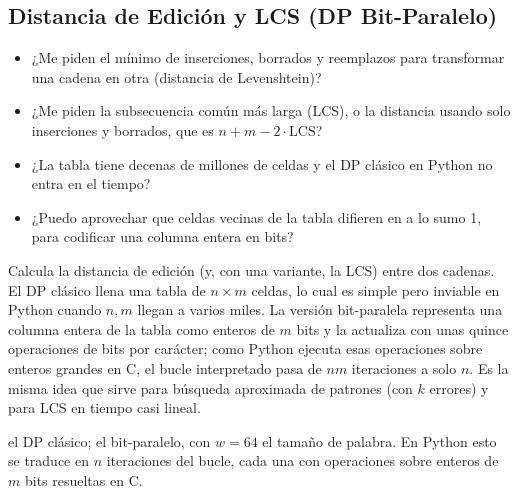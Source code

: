 \subsection{Distancia de Edición y LCS (DP Bit-Paralelo)}
\label{alg:6-2}


\begin{itemize}
\item ¿Me piden el mínimo de inserciones, borrados y reemplazos para transformar una cadena en otra (distancia de Levenshtein)?
\item ¿Me piden la subsecuencia común más larga (LCS), o la distancia usando solo inserciones y borrados, que es $n + m - 2\cdot\mathrm{LCS}$?
\item ¿La tabla  tiene decenas de millones de celdas y el DP clásico en Python no entra en el tiempo?
\item ¿Puedo aprovechar que celdas vecinas de la tabla difieren en a lo sumo 1, para codificar una columna entera en bits?
\end{itemize}

 Calcula la distancia de edición (y, con una variante, la LCS) entre dos cadenas. El DP clásico llena una tabla de $n \times m$ celdas, lo cual es simple pero inviable en Python cuando $n, m$ llegan a varios miles. La versión bit-paralela representa una columna entera de la tabla como enteros de $m$ bits y la actualiza con unas quince operaciones de bits por carácter; como Python ejecuta esas operaciones sobre enteros grandes en C, el bucle interpretado pasa de $nm$ iteraciones a solo $n$. Es la misma idea que sirve para búsqueda aproximada de patrones (con $k$ errores) y para LCS en tiempo casi lineal.

  el DP clásico;  el bit-paralelo, con $w = 64$ el tamaño de palabra. En Python esto se traduce en $n$ iteraciones del bucle, cada una con operaciones sobre enteros de $m$ bits resueltas en C.

